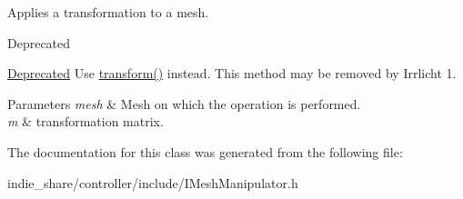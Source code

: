 Applies a transformation to a mesh. 

\begin{DoxyRefDesc}{Deprecated}
\item[\hyperlink{deprecated__deprecated000041}{Deprecated}]Use \hyperlink{classirr_1_1scene_1_1IMeshManipulator_a9f9962d31cbd4ebeb1be0812765884cf}{transform()} instead. This method may be removed by Irrlicht 1. \end{DoxyRefDesc}

\begin{DoxyParams}{Parameters}
{\em mesh} & Mesh on which the operation is performed. \\
\hline
{\em m} & transformation matrix. \\
\hline
\end{DoxyParams}


The documentation for this class was generated from the following file\+:\begin{DoxyCompactItemize}
\item 
indie\+\_\+share/controller/include/I\+Mesh\+Manipulator.\+h\end{DoxyCompactItemize}
